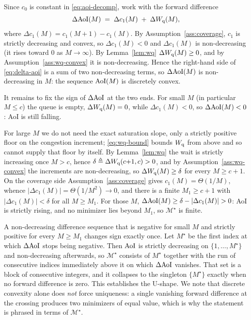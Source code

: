 \begin{IEEEproof}
Since $c_0$ is constant in \eqref{eq:aoi-decomp}, work with the forward difference
\begin{equation}
\label{eq:delta-aoi}
\Delta\mathrm{AoI}(M) \;=\; \Delta c_1(M) \;+\; \Delta W_{\mathrm q}(M),
\end{equation}
where $\Delta c_1(M)=c_1(M{+}1)-c_1(M)$. By Assumption~\ref{ass:coverage},
$c_1$ is strictly decreasing and convex, so $\Delta c_1(M)<0$ and $\Delta c_1(M)$
is non-decreasing (it rises toward $0$ as $M\to\infty$). By Lemma~\ref{lem:wq}
$\Delta W_{\mathrm q}(M)\ge0$, and by Assumption~\ref{ass:wq-convex} it is non-decreasing.
Hence the right-hand side of
\eqref{eq:delta-aoi} is a sum of two non-decreasing terms, so $\Delta\mathrm{AoI}(M)$ is
non-decreasing in $M$: the sequence $\mathrm{AoI}(M)$ is discretely convex.

It remains to fix the sign of $\Delta\mathrm{AoI}$ at the two ends. For small $M$
(in particular $M\le c$) the queue is empty, $\Delta W_{\mathrm q}(M)=0$, while
$\Delta c_1(M)<0$, so $\Delta\mathrm{AoI}(M)<0$: AoI is still falling.

For large $M$ we do not need the exact saturation slope, only a strictly positive
floor on the congestion increment; \eqref{eq:wq-bound} bounds $W_{\mathrm q}$ from above and
so cannot supply that floor by itself. By Lemma~\ref{lem:wq} the wait is strictly
increasing once $M>c$, hence $\delta\triangleq\Delta W_{\mathrm q}(c{+}1,c)>0$, and by
Assumption~\ref{ass:wq-convex} the increments are non-decreasing, so
$\Delta W_{\mathrm q}(M)\ge\delta$ for every $M\ge c+1$. On the coverage side
Assumption~\ref{ass:coverage} gives $c_1(M)=\Theta(1/M)$, whence
$|\Delta c_1(M)|=\Theta(1/M^{2})\to0$, and there is a finite $M_1\ge c+1$ with
$|\Delta c_1(M)|<\delta$ for all $M\ge M_1$. For those $M$,
$\Delta\Aoi(M)\ge\delta-|\Delta c_1(M)|>0$: AoI is strictly rising, and no
minimizer lies beyond $M_1$, so $\mathcal{M}^\star$ is finite.

A non-decreasing difference sequence that is negative for small $M$ and strictly
positive for every $M\ge M_1$ changes sign exactly once. Let $M^\star$ be the
first index at which $\Delta\mathrm{AoI}$ stops being negative. Then $\mathrm{AoI}$ is strictly
decreasing on $\{1,\dots,M^\star\}$ and non-decreasing afterwards, so
$\mathcal{M}^\star$ consists of $M^\star$ together with the run of consecutive
indices immediately above it on which $\Delta\mathrm{AoI}$ vanishes. That set is a block
of consecutive integers, and it collapses to the singleton $\{M^\star\}$ exactly
when no forward difference is zero. This establishes the U-shape. We note that
discrete convexity alone does \emph{not} force uniqueness: a single vanishing
forward difference at the crossing produces two minimizers of equal value, which
is why the statement is phrased in terms of $\mathcal{M}^\star$.


\end{IEEEproof}
